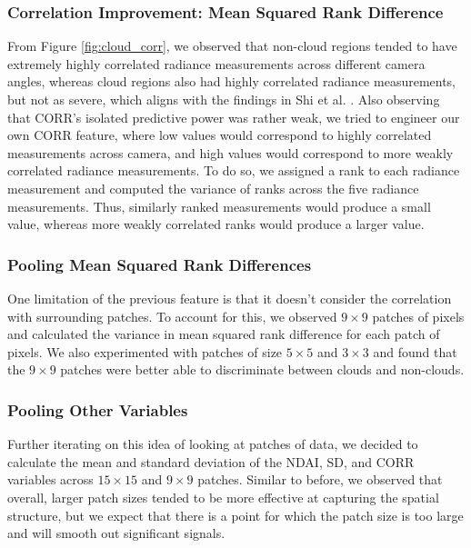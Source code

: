 \documentclass[11pt,letterpaper]{article}
\begin{document}
\subsubsection{Correlation Improvement: Mean Squared Rank Difference}

From Figure \ref{fig:cloud_corr}, we observed that non-cloud regions tended to have extremely highly correlated radiance measurements across different camera angles, whereas cloud regions also had highly correlated radiance measurements, but not as severe, which aligns with the findings in Shi et al. \cite{Shi}. Also observing that CORR's isolated predictive power was rather weak, we tried to engineer our own CORR feature, where low values would correspond to highly correlated measurements across camera, and high values would correspond to more weakly correlated radiance measurements. To do so, we assigned a rank to each radiance measurement and computed the variance of ranks across the five radiance measurements. Thus, similarly ranked measurements would produce a small value, whereas more weakly correlated ranks would produce a larger value.

\subsubsection{Pooling Mean Squared Rank Differences}

One limitation of the previous feature is that it doesn't consider the correlation with surrounding patches. To account for this, we observed $9\times 9$ patches of pixels and calculated the variance in mean squared rank difference for each patch of pixels. We also experimented with patches of size $5 \times 5$ and $3 \times 3$ and found that the $9 \times 9$ patches were better able to discriminate between clouds and non-clouds.

\subsubsection{Pooling Other Variables}

Further iterating on this idea of looking at patches of data, we decided to calculate the mean and standard deviation of the NDAI, SD, and CORR variables across $15 \times 15$ and $9 \times 9$ patches. Similar to before, we observed that overall, larger patch sizes tended to be more effective at capturing the spatial structure, but we expect that there is a point for which the patch size is too large and will smooth out significant signals.
\end{document}
